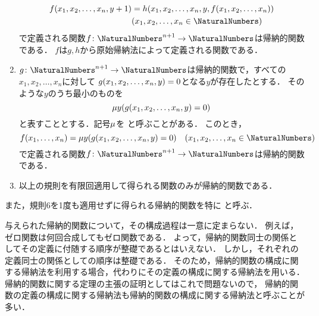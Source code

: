\begin{Def}
\begin{enumerate}
\begin{align*}
			      \apply{f}{x_1, x_2, \dots, x_n, y + 1} & = \apply{h}{x_1, x_2, \dots, x_n, y, \apply{f}{x_1, x_2, \dots, x_n}}                          \\
			                                             & \text{(\(x_1, x_2, \dots, x_n \in \NaturalNumbers\))}
		      \end{align*}
		      で定義される関数\(f \colon \NaturalNumbers^{n+1} \to \NaturalNumbers\)は帰納的関数である．
		      \(f\)は\(g, h\)から原始帰納法によって定義される関数である．
		\item \(g \colon \NaturalNumbers^{n + 1} \to \NaturalNumbers\)は帰納的関数で，すべての\(x_1, x_2, \dots, x_n\)に対して
		      \(\apply{g}{x_1, x_2, \dots, x_n, y} = 0\)となる\(y\)が存在したとする．
		      そのような\(y\)のうち最小のものを
		      \begin{equation}
			      \apply{\muoperator y}{\apply{g}{x_1, x_2, \dots, x_n, y} = 0}
			      \label{eq:muoperator}
		      \end{equation}
		      と表すこととする．記号\(\mu\)を
		      と呼ぶことがある．
		      このとき，
		      \[
			      \apply{f}{x_1, \dots, x_n} = \apply{\muoperator y}{\apply{g}{x_1, x_2, \dots, x_n, y} = 0}
			      \quad \text{(\(x_1, x_2, \dots, x_n \in \NaturalNumbers\))}
		      \]
		      で定義される関数\(f \colon \NaturalNumbers^{n+1} \to \NaturalNumbers\)は帰納的関数である．
		\item 以上の規則を有限回適用して得られる関数のみが帰納的関数である．
	\end{enumerate}

	また，規則6を1度も適用せずに得られる帰納的関数を特に
	と呼ぶ．
\end{Def}

\begin{Note}
	与えられた帰納的関数について，その構成過程は一意に定まらない．
	例えば，ゼロ関数は何回合成してもゼロ関数である．
	よって，帰納的関数同士の関係としてその定義に付随する順序が整礎であるとはいえない．
	しかし，それぞれの定義同士の関係としての順序は整礎である．
	そのため，帰納的関数の構成に関する帰納法を利用する場合，代わりにその定義の構成に関する帰納法を用いる．
	帰納的関数に関する定理の主張の証明としてはこれで問題ないので，
	帰納的関数の定義の構成に関する帰納法も帰納的関数の構成に関する帰納法と呼ぶことが多い．
\end{Note}

